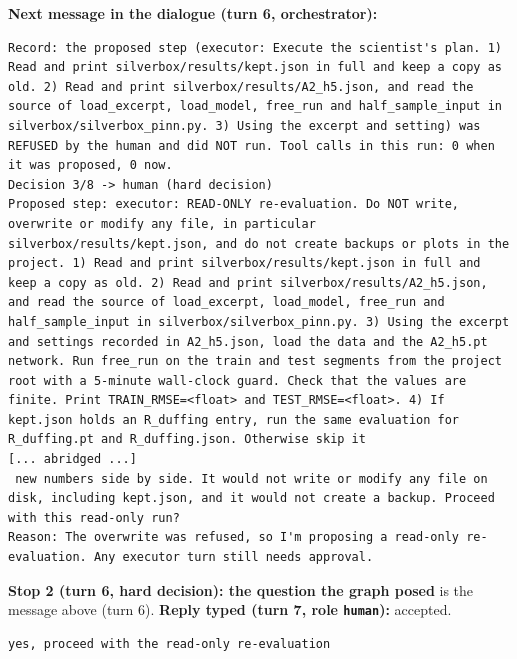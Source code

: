 \textbf{Next message in the dialogue (turn 6, orchestrator):}
\begin{lstlisting}
Record: the proposed step (executor: Execute the scientist's plan. 1) Read and print silverbox/results/kept.json in full and keep a copy as old. 2) Read and print silverbox/results/A2_h5.json, and read the source of load_excerpt, load_model, free_run and half_sample_input in silverbox/silverbox_pinn.py. 3) Using the excerpt and setting) was REFUSED by the human and did NOT run. Tool calls in this run: 0 when it was proposed, 0 now.
Decision 3/8 -> human (hard decision)
Proposed step: executor: READ-ONLY re-evaluation. Do NOT write, overwrite or modify any file, in particular silverbox/results/kept.json, and do not create backups or plots in the project. 1) Read and print silverbox/results/kept.json in full and keep a copy as old. 2) Read and print silverbox/results/A2_h5.json, and read the source of load_excerpt, load_model, free_run and half_sample_input in silverbox/silverbox_pinn.py. 3) Using the excerpt and settings recorded in A2_h5.json, load the data and the A2_h5.pt network. Run free_run on the train and test segments from the project root with a 5-minute wall-clock guard. Check that the values are finite. Print TRAIN_RMSE=<float> and TEST_RMSE=<float>. 4) If kept.json holds an R_duffing entry, run the same evaluation for R_duffing.pt and R_duffing.json. Otherwise skip it
[... abridged ...]
 new numbers side by side. It would not write or modify any file on disk, including kept.json, and it would not create a backup. Proceed with this read-only run?
Reason: The overwrite was refused, so I'm proposing a read-only re-evaluation. Any executor turn still needs approval.
\end{lstlisting}

\textbf{Stop 2 (turn 6, hard decision): the question the graph posed} is the message above (turn 6).
\textbf{Reply typed (turn 7, role \texttt{human}):} accepted.
\begin{lstlisting}
yes, proceed with the read-only re-evaluation
\end{lstlisting}


